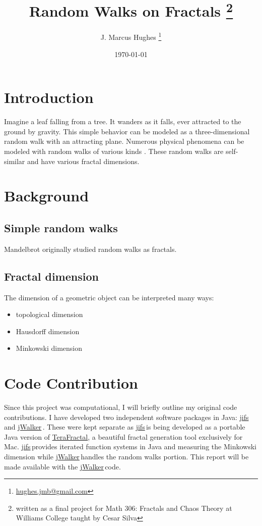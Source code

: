 \documentclass{article}
\title{Random Walks on Fractals \thanks{written as a final project for Math 306: Fractals and Chaos Theory at Williams College taught by Cesar Silva}}
\date{\today}
\author{J. Marcus Hughes \thanks{\href{mailto:hughes.jmb@gmail.com}{hughes.jmb@gmail.com}}}
\newcommand{\todo}[1]{{\color{red}{\textbf{#1}}}}
\newcommand{\jifs}{\href{https://github.com/jmbhughes/jifs}{jifs}\,}
\newcommand{\jwalker}{\href{https://github.com/jmbhughes/jWalker}{jWalker}\,}
\begin{document}
\maketitle

\section{Introduction}
Imagine a leaf falling from a tree. It wanders as it falls, ever attracted to the ground by gravity. This simple behavior can be modeled as a three-dimensional random walk with an attracting plane. Numerous physical phenomena can be modeled with random walks of various kinds \todo{enumerate}. These random walks are self-similar \todo{why?} and have various fractal dimensions. 

\section{Background}
\subsection{Simple random walks}
Mandelbrot originally studied random walks as fractals.  

\subsection{Fractal dimension}
The dimension of a geometric object can be interpreted many ways:
\begin{itemize}
\item topological dimension
\item Hausdorff dimension
\item Minkowski dimension
\end{itemize}

\section{Code Contribution}
Since this project was computational, I will briefly outline my original code contributions. I have developed two independent software packages in Java: \jifs and \jwalker. These were kept separate as \jifs is being developed as a portable Java version of \href{https://www.matheasel.com/terafractal/mac/}{TeraFractal}, a beautiful fractal generation tool exclusively for Mac. \jifs provides iterated function systems in Java and measuring the Minkowski dimension while \jwalker handles the random walks portion. This report will be made available with the \jwalker code.
\end{document}
